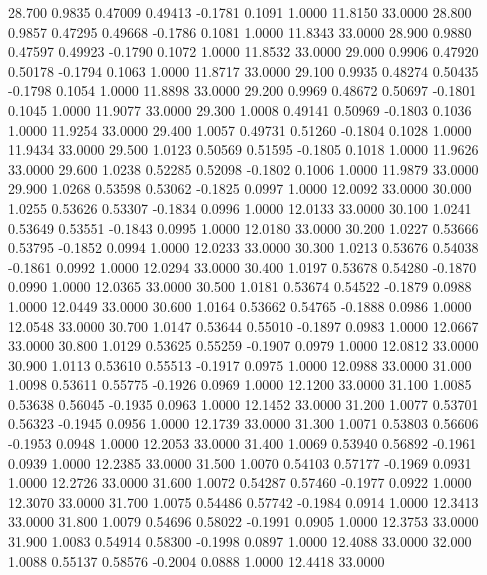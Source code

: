   28.700   0.9835   0.47009   0.49413  -0.1781   0.1091   1.0000  11.8150  33.0000
  28.800   0.9857   0.47295   0.49668  -0.1786   0.1081   1.0000  11.8343  33.0000
  28.900   0.9880   0.47597   0.49923  -0.1790   0.1072   1.0000  11.8532  33.0000
  29.000   0.9906   0.47920   0.50178  -0.1794   0.1063   1.0000  11.8717  33.0000
  29.100   0.9935   0.48274   0.50435  -0.1798   0.1054   1.0000  11.8898  33.0000
  29.200   0.9969   0.48672   0.50697  -0.1801   0.1045   1.0000  11.9077  33.0000
  29.300   1.0008   0.49141   0.50969  -0.1803   0.1036   1.0000  11.9254  33.0000
  29.400   1.0057   0.49731   0.51260  -0.1804   0.1028   1.0000  11.9434  33.0000
  29.500   1.0123   0.50569   0.51595  -0.1805   0.1018   1.0000  11.9626  33.0000
  29.600   1.0238   0.52285   0.52098  -0.1802   0.1006   1.0000  11.9879  33.0000
  29.900   1.0268   0.53598   0.53062  -0.1825   0.0997   1.0000  12.0092  33.0000
  30.000   1.0255   0.53626   0.53307  -0.1834   0.0996   1.0000  12.0133  33.0000
  30.100   1.0241   0.53649   0.53551  -0.1843   0.0995   1.0000  12.0180  33.0000
  30.200   1.0227   0.53666   0.53795  -0.1852   0.0994   1.0000  12.0233  33.0000
  30.300   1.0213   0.53676   0.54038  -0.1861   0.0992   1.0000  12.0294  33.0000
  30.400   1.0197   0.53678   0.54280  -0.1870   0.0990   1.0000  12.0365  33.0000
  30.500   1.0181   0.53674   0.54522  -0.1879   0.0988   1.0000  12.0449  33.0000
  30.600   1.0164   0.53662   0.54765  -0.1888   0.0986   1.0000  12.0548  33.0000
  30.700   1.0147   0.53644   0.55010  -0.1897   0.0983   1.0000  12.0667  33.0000
  30.800   1.0129   0.53625   0.55259  -0.1907   0.0979   1.0000  12.0812  33.0000
  30.900   1.0113   0.53610   0.55513  -0.1917   0.0975   1.0000  12.0988  33.0000
  31.000   1.0098   0.53611   0.55775  -0.1926   0.0969   1.0000  12.1200  33.0000
  31.100   1.0085   0.53638   0.56045  -0.1935   0.0963   1.0000  12.1452  33.0000
  31.200   1.0077   0.53701   0.56323  -0.1945   0.0956   1.0000  12.1739  33.0000
  31.300   1.0071   0.53803   0.56606  -0.1953   0.0948   1.0000  12.2053  33.0000
  31.400   1.0069   0.53940   0.56892  -0.1961   0.0939   1.0000  12.2385  33.0000
  31.500   1.0070   0.54103   0.57177  -0.1969   0.0931   1.0000  12.2726  33.0000
  31.600   1.0072   0.54287   0.57460  -0.1977   0.0922   1.0000  12.3070  33.0000
  31.700   1.0075   0.54486   0.57742  -0.1984   0.0914   1.0000  12.3413  33.0000
  31.800   1.0079   0.54696   0.58022  -0.1991   0.0905   1.0000  12.3753  33.0000
  31.900   1.0083   0.54914   0.58300  -0.1998   0.0897   1.0000  12.4088  33.0000
  32.000   1.0088   0.55137   0.58576  -0.2004   0.0888   1.0000  12.4418  33.0000
